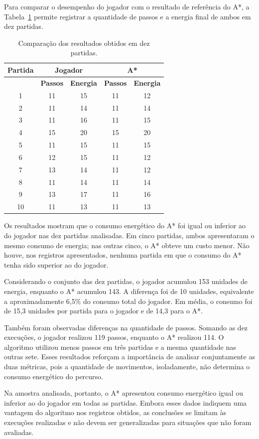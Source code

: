 Para comparar o desempenho do jogador com o resultado de referência do A*,
a Tabela~\ref{tab:comparacao-partidas} permite registrar a quantidade de passos
e a energia final de ambos em dez partidas.

\begin{table}[htbp]
	\centering
	\caption{Comparação dos resultados obtidos em dez partidas.}
	\label{tab:comparacao-partidas}
	\small
	\begin{tabular}{|c|c|c|c|c|}
		\hline
		\textbf{Partida} &
		\multicolumn{2}{c|}{\textbf{Jogador}} &
		\multicolumn{2}{c|}{\textbf{A*}} \\
		\hline
		& \textbf{Passos} & \textbf{Energia} &
		\textbf{Passos} & \textbf{Energia} \\
		\hline
		1 & 11 & 15 & 11 & 12 \\
		\hline
		2 & 11 & 14 & 11 & 14 \\
		\hline
		3 & 11 & 16 & 11 & 15 \\
		\hline
		4 & 15 & 20 & 15 & 20 \\
		\hline
		5 & 11 & 15 & 11 & 15 \\
		\hline
		6 & 12 & 15 & 11 & 12 \\
		\hline
		7 & 13 & 14 & 11 & 12 \\
		\hline
		8 & 11 & 14 & 11 & 14 \\
		\hline
		9 & 13 & 17 & 11 & 16 \\
		\hline
		10 & 11 & 13 & 11 & 13 \\
		\hline
	\end{tabular}
\end{table}

Os resultados mostram que o consumo energético do A* foi igual ou inferior
ao do jogador nas dez partidas analisadas. Em cinco partidas, ambos apresentaram
o mesmo consumo de energia; nas outras cinco, o A* obteve um custo menor.
Não houve, nos registros apresentados, nenhuma partida em que o consumo do A*
tenha sido superior ao do jogador.

Considerando o conjunto das dez partidas, o jogador acumulou 153 unidades de
energia, enquanto o A* acumulou 143. A diferença foi de 10 unidades, equivalente
a aproximadamente 6,5\% do consumo total do jogador. Em média, o consumo foi
de 15,3 unidades por partida para o jogador e de 14,3 para o A*.

Também foram observadas diferenças na quantidade de passos. Somando as dez
execuções, o jogador realizou 119 passos, enquanto o A* realizou 114. O algoritmo
utilizou menos passos em três partidas e a mesma quantidade nas outras sete.
Esses resultados reforçam a importância de analisar conjuntamente as duas
métricas, pois a quantidade de movimentos, isoladamente, não determina o
consumo energético do percurso.

Na amostra analisada, portanto, o A* apresentou consumo energético igual ou
inferior ao do jogador em todas as partidas. Embora esses dados indiquem uma
vantagem do algoritmo nos registros obtidos, as conclusões se limitam às
execuções realizadas e não devem ser generalizadas para situações que não
foram avaliadas.